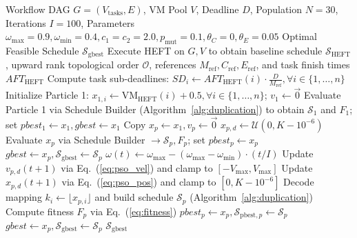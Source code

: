 \documentclass[journal]{IEEEtran}
\begin{document}
\begin{algorithm}[t]
\caption{DD-HPSO Scientific Workflow Scheduling Algorithm}
\label{alg:ddhpso}
\begin{algorithmic}[1]
\REQUIRE Workflow DAG $G=(V_{\text{tasks}}, E)$, VM Pool $V$, Deadline $D$, Population $N=30$, Iterations $I=100$, Parameters $\omega_{\text{max}}=0.9, \omega_{\text{min}}=0.4, c_1=c_2=2.0, p_{\text{mut}}=0.1, \theta_C=0, \theta_E=0.05$
\ENSURE Optimal Feasible Schedule $\mathcal{S}_{\text{gbest}}$
\STATE Execute HEFT on $G, V$ to obtain baseline schedule $\mathcal{S}_{\text{HEFT}}$, upward rank topological order $\mathcal{O}$, references $M_{\text{ref}}, C_{\text{ref}}, E_{\text{ref}}$, and task finish times $AFT_{\text{HEFT}}$
\STATE Compute task sub-deadlines: $SD_i \leftarrow AFT_{\text{HEFT}}(i) \cdot \frac{D}{M_{\text{ref}}}, \forall i \in \{1,\dots,n\}$
\STATE Initialize Particle 1: $x_{1,i} \leftarrow \text{VM}_{\text{HEFT}}(i) + 0.5, \forall i \in \{1,\dots,n\}$; $v_{1} \leftarrow \vec{0}$
\STATE Evaluate Particle 1 via Schedule Builder (Algorithm~\ref{alg:duplication}) to obtain $\mathcal{S}_1$ and $F_1$; set $pbest_1 \leftarrow x_1, gbest \leftarrow x_1$
    \STATE Copy $x_p \leftarrow x_1, v_p \leftarrow \vec{0}$
            \STATE $x_{p,d} \leftarrow \mathcal{U}(0, K - 10^{-6})$
        \ENDIF
    \ENDFOR
    \STATE Evaluate $x_p$ via Schedule Builder $\to \mathcal{S}_p, F_p$; set $pbest_p \leftarrow x_p$
        \STATE $gbest \leftarrow x_p, \mathcal{S}_{\text{gbest}} \leftarrow \mathcal{S}_p$
    \ENDIF
\ENDFOR
{}
    \STATE $\omega(t) \leftarrow \omega_{\text{max}} - (\omega_{\text{max}} - \omega_{\text{min}}) \cdot (t / I)$
            \STATE Update $v_{p,d}(t+1)$ via Eq.~(\ref{eq:pso_vel}) and clamp to $[-V_{\text{max}}, V_{\text{max}}]$
            \STATE Update $x_{p,d}(t+1)$ via Eq.~(\ref{eq:pso_pos}) and clamp to $[0, K - 10^{-6}]$
        \ENDFOR
        \STATE Decode mapping $k_i \leftarrow \lfloor x_{p,i} \rfloor$ and build schedule $\mathcal{S}_p$ (Algorithm~\ref{alg:duplication})
        \STATE Compute fitness $F_p$ via Eq.~(\ref{eq:fitness})
            \STATE $pbest_p \leftarrow x_p, \mathcal{S}_{\text{pbest},p} \leftarrow \mathcal{S}_p$
                \STATE $gbest \leftarrow x_p, \mathcal{S}_{\text{gbest}} \leftarrow \mathcal{S}_p$
            \ENDIF
        \ENDIF
    \ENDFOR
\ENDFOR
\RETURN $\mathcal{S}_{\text{gbest}}$
\end{algorithmic}
\end{algorithm}
\end{document}
